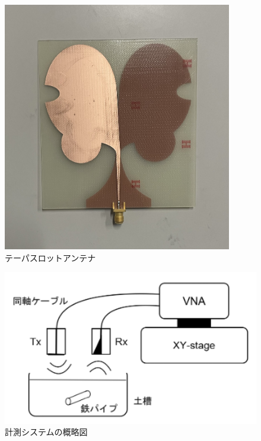 \documentclass[11pt,a4paper,uplatex]{ujarticle}
\begin{document}
    \begin{figure}[hbtp]
      \centering
      \includegraphics[keepaspectratio, width=100mm]{Images/rxantenna.png}
      \caption{テーパスロットアンテナ}\label{fig:rxantenna}
    \end{figure}

    \begin{figure}[hbtp]
      \centering
      \includegraphics[keepaspectratio, width=130mm]{Images/XYstage_configuration.png}
      \caption{計測システムの概略図}\label{fig:XYstage_configuration}
    \end{figure}
\end{document}
